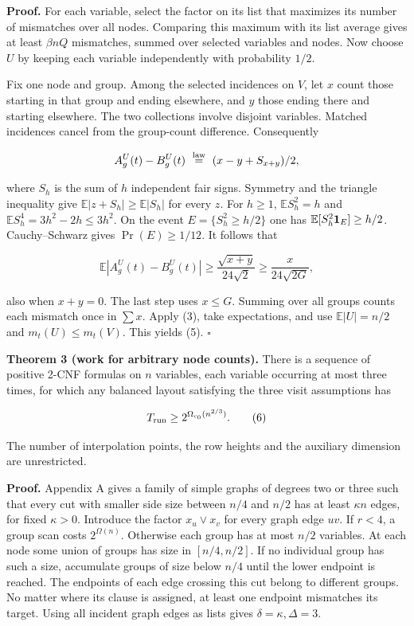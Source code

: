 \documentclass[
  10pt,
]{article}
\begin{document}
\textbf{Proof.} For each variable, select the factor on its list that
maximizes its number of mismatches over all nodes. Comparing this
maximum with its list average gives at least \(\beta nQ\) mismatches,
summed over selected variables and nodes. Now choose \(U\) by keeping
each variable independently with probability \(1/2\).

Fix one node and group. Among the selected incidences on \(V\), let
\(x\) count those starting in that group and ending elsewhere, and \(y\)
those ending there and starting elsewhere. The two collections involve
disjoint variables. Matched incidences cancel from the group-count
difference. Consequently

\[
 A_g^U(t)-B_g^U(t)\ \stackrel{\rm law}{=}\ (x-y+S_{x+y})/2 ,
\]

where \(S_h\) is the sum of \(h\) independent fair signs. Symmetry and
the triangle inequality give \(\mathbb E|z+S_h|\ge\mathbb E|S_h|\) for
every \(z\). For \(h\ge1\), \(\mathbb E S_h^2=h\) and
\(\mathbb E S_h^4=3h^2-2h\le3h^2\). On the event \(E=\{S_h^2\ge h/2\}\)
one has \(\mathbb E[S_h^2{\bf1}_E]\ge h/2\). Cauchy--Schwarz gives
\(\Pr(E)\ge1/12\). It follows that

\[
 \mathbb E|A_g^U(t)-B_g^U(t)|
     \ge\frac{\sqrt{x+y}}{24\sqrt2}
     \ge\frac{x}{24\sqrt{2G}} ,
\]

also when \(x+y=0\). The last step uses \(x\le G\). Summing over all
groups counts each mismatch once in \(\sum x\). Apply (3), take
expectations, and use \(\mathbb E|U|=n/2\) and \(m_t(U)\le m_t(V)\).
This yields (5). \(\square\)

\textbf{Theorem 3 (work for arbitrary node counts).} There is a sequence
of positive 2-CNF formulas on \(n\) variables, each variable occurring
at most three times, for which any balanced layout satisfying the three
visit assumptions has

\[
                        T_{\rm run}\ge 2^{\Omega_{c_0}(n^{2/3})}.       \tag{6}
\]

The number of interpolation points, the row heights and the auxiliary
dimension are unrestricted.

\textbf{Proof.} Appendix A gives a family of simple graphs of degrees
two or three such that every cut with smaller side size between \(n/4\)
and \(n/2\) has at least \(\kappa n\) edges, for fixed \(\kappa>0\).
Introduce the factor \(x_u\lor x_v\) for every graph edge \(uv\). If
\(r<4\), a group scan costs \(2^{\Omega(n)}\). Otherwise each group has
at most \(n/2\) variables. At each node some union of groups has size in
\([n/4,n/2]\). If no individual group has such a size, accumulate groups
of size below \(n/4\) until the lower endpoint is reached. The endpoints
of each edge crossing this cut belong to different groups. No matter
where its clause is assigned, at least one endpoint mismatches its
target. Using all incident graph edges as lists gives
\(\delta=\kappa,\Delta=3\).
\end{document}
